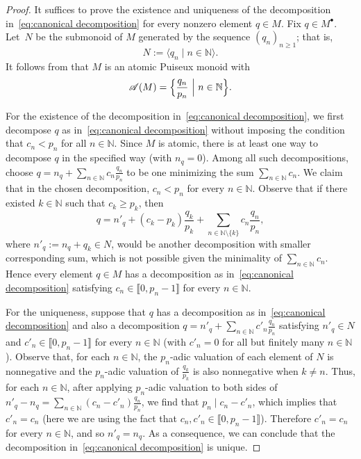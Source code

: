 \documentclass[12pt]{amsart}
\theoremstyle{definition}
\numberwithin{equation}{section}
\newcommand{\nn}{\mathbb{N}}
\providecommand\ldb{\llbracket}
\providecommand\rdb{\rrbracket}
\begin{document}
\begin{proof}
	It suffices to prove the existence and uniqueness of the decomposition in~\eqref{eq:canonical decomposition} for every nonzero element $q \in M$. Fix $q \in M^\bullet$. Let~$N$ be the submonoid of $M$ generated by the sequence $(q_n)_{n \ge 1}$; that is,
	\[
		N := \langle q_n \mid n \in \nn \rangle.
	\]
	It follows from \cite[Proposition~3.1]{GL23} that $M$ is an atomic Puiseux monoid with
	\[
		\mathcal{A}(M) = \Big\{ \frac{q_n}{p_n} \ \Big{|} \ n \in \nn \Big\}.
	\]
	
 	For the existence of the decomposition in~\eqref{eq:canonical decomposition}, we first decompose $q$ as in~\eqref{eq:canonical decomposition} without imposing the condition that $c_n < p_n$ for all $n \in \nn$. Since $M$ is atomic, there is at least one way to decompose $q$ in the specified way (with $n_q = 0$). Among all such decompositions, choose $q = n_q + \sum_{n \in \nn} c_n \frac{q_n}{p_n}$ to be one minimizing the sum $\sum_{n \in \nn} c_n$. We claim that in the chosen decomposition, $c_n < p_n$ for every $n \in \nn$. Observe that if there existed $k \in \nn$ such that $c_k \ge p_k$, then
	\[
		q = n'_q + (c_k - p_k) \frac{q_k}{p_k} + \! \! \sum_{n \in \nn \setminus \{k\}} \! \! c_n \frac{q_n}{p_n},
	\]
	where $n'_q := n_q + q_k \in N$, would be another decomposition with smaller corresponding sum, which is not possible given the minimality of $\sum_{n \in \nn} c_n$. Hence every element $q \in M$ has a decomposition as in~\eqref{eq:canonical decomposition} satisfying $c_n \in \ldb 0, p_n - 1 \rdb$ for every $n \in \nn$. 
	
	For the uniqueness, suppose that $q$ has a decomposition as in~\eqref{eq:canonical decomposition} and also a decomposition $q = n'_q + \sum_{n \in \nn} c'_n \frac{q_n}{p_n}$ satisfying $n'_q \in N$ and $c'_n \in \ldb 0, p_n - 1 \rdb$ for every $n \in \nn$ (with $c'_n = 0$ for all but finitely many $n \in \nn$). Observe that, for each $n \in \nn$, the $p_n$-adic valuation of each element of $N$ is nonnegative and the $p_n$-adic valuation of $\frac{q_k}{p_k}$ is also nonnegative when $k \neq n$. Thus, for each $n \in \nn$, after applying $p_n$-adic valuation to both sides of $n'_q - n_q = \sum_{n \in \nn} (c_n - c'_n) \frac{q_n}{p_n}$, we find that $p_n \mid c_n - c'_n$, which implies that $c'_n = c_n$ (here we are using the fact that $c_n, c'_n \in \ldb 0, p_n - 1 \rdb$). Therefore $c'_n = c_n$ for every $n \in \nn$, and so $n'_q = n_q$. As a consequence, we can conclude that the decomposition in~\eqref{eq:canonical decomposition} is unique.
\end{proof}
\end{document}
